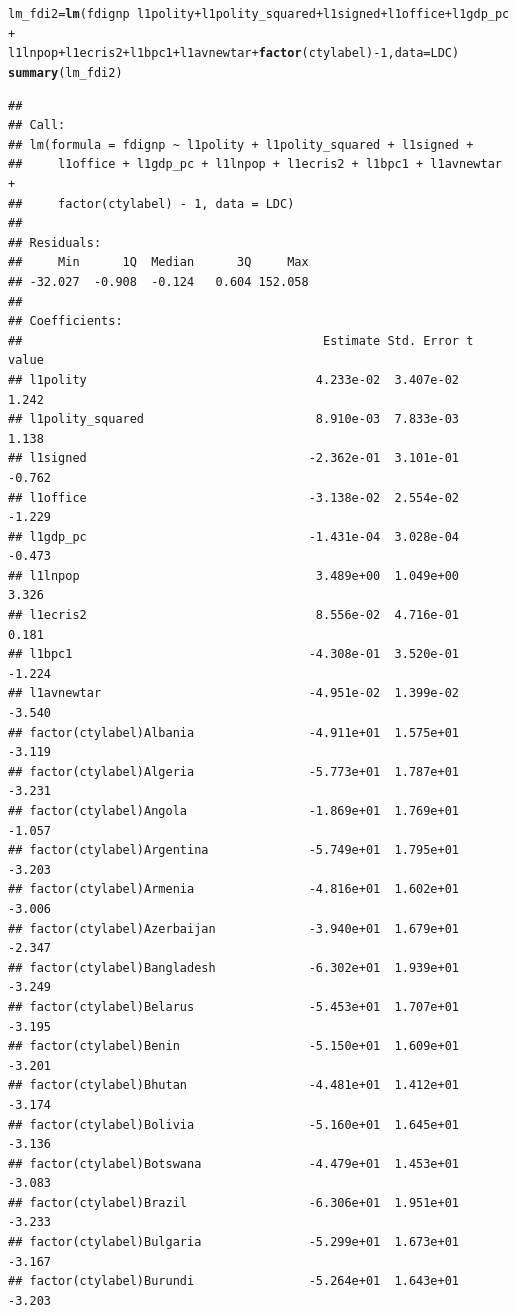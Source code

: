 \documentclass[12pt]{article}\usepackage[]{graphicx}\usepackage[]{color}
\makeatletter
\newcommand{\hlnum}[1]{\textcolor[rgb]{0.686,0.059,0.569}{#1}}%
\newcommand{\hlopt}[1]{\textcolor[rgb]{0,0,0}{#1}}%
\newcommand{\hlstd}[1]{\textcolor[rgb]{0.345,0.345,0.345}{#1}}%
\newcommand{\hlkwb}[1]{\textcolor[rgb]{0.69,0.353,0.396}{#1}}%
\newcommand{\hlkwc}[1]{\textcolor[rgb]{0.333,0.667,0.333}{#1}}%
\newcommand{\hlkwd}[1]{\textcolor[rgb]{0.737,0.353,0.396}{\textbf{#1}}}%
\newenvironment{kframe}{%
 \def\at@end@of@kframe{}%
 \ifinner\ifhmode%
  \def\at@end@of@kframe{\end{minipage}}%
  \begin{minipage}{\columnwidth}%
 \fi\fi%
 \def\FrameCommand##1{\hskip\@totalleftmargin \hskip-\fboxsep
 \colorbox{shadecolor}{##1}\hskip-\fboxsep
     \hskip-\linewidth \hskip-\@totalleftmargin \hskip\columnwidth}%
 \MakeFramed {\advance\hsize-\width
   \@totalleftmargin\z@ \linewidth\hsize
   \@setminipage}}%
 {\par\unskip\endMakeFramed%
 \at@end@of@kframe}
\newenvironment{knitrout}{}{} %
\makeatother
\begin{document}
\begin{knitrout}
\begin{kframe}
\begin{alltt}
\hlstd{lm_fdi2} \hlkwb{=} \hlkwd{lm}\hlstd{(fdignp} \hlopt{~} \hlstd{l1polity} \hlopt{+} \hlstd{l1polity_squared} \hlopt{+} \hlstd{l1signed} \hlopt{+} \hlstd{l1office} \hlopt{+} \hlstd{l1gdp_pc} \hlopt{+}
    \hlstd{l1lnpop} \hlopt{+} \hlstd{l1ecris2} \hlopt{+} \hlstd{l1bpc1} \hlopt{+} \hlstd{l1avnewtar} \hlopt{+} \hlkwd{factor}\hlstd{(ctylabel)} \hlopt{-} \hlnum{1}\hlstd{,} \hlkwc{data} \hlstd{= LDC)}
\hlkwd{summary}\hlstd{(lm_fdi2)}
\end{alltt}
\begin{verbatim}
## 
## Call:
## lm(formula = fdignp ~ l1polity + l1polity_squared + l1signed + 
##     l1office + l1gdp_pc + l1lnpop + l1ecris2 + l1bpc1 + l1avnewtar + 
##     factor(ctylabel) - 1, data = LDC)
## 
## Residuals:
##     Min      1Q  Median      3Q     Max 
## -32.027  -0.908  -0.124   0.604 152.058 
## 
## Coefficients:
##                                          Estimate Std. Error t value
## l1polity                                4.233e-02  3.407e-02   1.242
## l1polity_squared                        8.910e-03  7.833e-03   1.138
## l1signed                               -2.362e-01  3.101e-01  -0.762
## l1office                               -3.138e-02  2.554e-02  -1.229
## l1gdp_pc                               -1.431e-04  3.028e-04  -0.473
## l1lnpop                                 3.489e+00  1.049e+00   3.326
## l1ecris2                                8.556e-02  4.716e-01   0.181
## l1bpc1                                 -4.308e-01  3.520e-01  -1.224
## l1avnewtar                             -4.951e-02  1.399e-02  -3.540
## factor(ctylabel)Albania                -4.911e+01  1.575e+01  -3.119
## factor(ctylabel)Algeria                -5.773e+01  1.787e+01  -3.231
## factor(ctylabel)Angola                 -1.869e+01  1.769e+01  -1.057
## factor(ctylabel)Argentina              -5.749e+01  1.795e+01  -3.203
## factor(ctylabel)Armenia                -4.816e+01  1.602e+01  -3.006
## factor(ctylabel)Azerbaijan             -3.940e+01  1.679e+01  -2.347
## factor(ctylabel)Bangladesh             -6.302e+01  1.939e+01  -3.249
## factor(ctylabel)Belarus                -5.453e+01  1.707e+01  -3.195
## factor(ctylabel)Benin                  -5.150e+01  1.609e+01  -3.201
## factor(ctylabel)Bhutan                 -4.481e+01  1.412e+01  -3.174
## factor(ctylabel)Bolivia                -5.160e+01  1.645e+01  -3.136
## factor(ctylabel)Botswana               -4.479e+01  1.453e+01  -3.083
## factor(ctylabel)Brazil                 -6.306e+01  1.951e+01  -3.233
## factor(ctylabel)Bulgaria               -5.299e+01  1.673e+01  -3.167
## factor(ctylabel)Burundi                -5.264e+01  1.643e+01  -3.203

\end{verbatim}
\end{kframe}
\end{knitrout}
\end{document}

